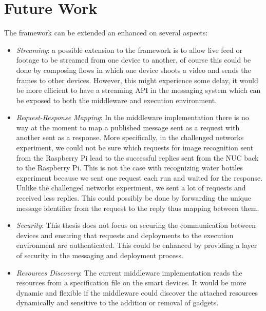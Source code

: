 \section{Future Work}
The framework can be extended an enhanced on several aspects:
\begin{itemize}
\item \textit{Streaming}: a possible extension to the framework is to allow live feed or footage to be streamed from one device to another, of course this could be done by composing flows in which one device shoots a video and sends the frames to other devices. However, this might experience some delay, it would be more efficient to have a streaming API in the messaging system which can be exposed to both the middleware and execution environment.

\item \textit{Request-Response Mapping}: In the middleware implementation there is no way at the moment to map a published message sent as a request  with another sent as a response. More specifically, in the challenged networks experiment, we could not be sure which requests for image recognition sent from the Raspberry Pi lead to the successful  replies  sent from the NUC back to the Raspberry Pi. This is not the case with recognizing water bottles experiment because we sent one request each run and waited for the response. Unlike the challenged networks experiment, we sent a lot of requests and received less replies. This could possibly be done by forwarding the unique message identifier from the request to the reply thus mapping between them.

\item \textit{Security}: This thesis does  not focus on securing the communication between devices and ensuring that requests and deployments to the execution environment are authenticated. This could be enhanced by providing a layer of security in the messaging and deployment process.

\item \textit{Resources Discovery}: The current middleware implementation reads the resources from a specification file on the smart devices. It would be more dynamic and flexible if the middleware could discover the attached resources dynamically and sensitive to the addition or removal of gadgets. 

\end{itemize}